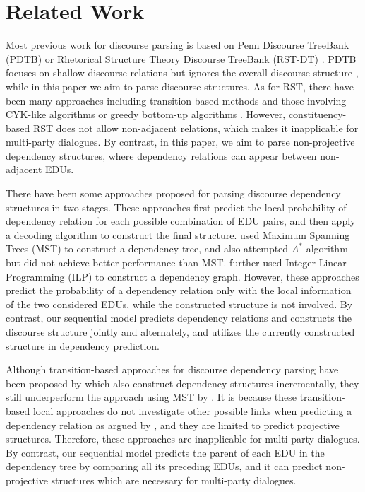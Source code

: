 \documentclass[letterpaper]{article} \usepackage{aaai19}  \usepackage{times}  \usepackage{helvet}  \usepackage{courier}  \usepackage{url}  \usepackage{graphicx}  \usepackage{amssymb}
\begin{document}
\section{Related Work}

Most previous work for discourse parsing is based on Penn Discourse TreeBank (PDTB) \cite{prasad2007penn} or Rhetorical Structure Theory Discourse
TreeBank (RST-DT) \cite{mann1988rhetorical}. 
PDTB focuses on shallow discourse relations but ignores the overall discourse structure \cite{yang2018scidtb}, while in this paper we aim to parse discourse structures.
As for RST, there have been many approaches including transition-based methods  \cite{braud2017cross,wang2017two,yu2018transition} and those involving CYK-like algorithms \cite{joty2015codra,li2016discourse,liu2017learning} or greedy bottom-up algorithms \cite{feng2014linear}. 
However, constituency-based RST does not allow non-adjacent relations, which makes it inapplicable for multi-party dialogues.
By contrast, in this paper, we aim to parse non-projective dependency structures, where dependency relations can appear between non-adjacent EDUs.

There have been some approaches proposed for parsing discourse dependency structures in two stages.
These approaches first predict the local probability of dependency relation for each possible combination of EDU pairs, and then apply a decoding algorithm to construct the final structure. \cite{muller2012constrained,li2014text,afantenos2015discourse} used Maximum Spanning Trees (MST) to construct a dependency tree, and \cite{muller2012constrained} also attempted $A^*$ algorithm but did not achieve better performance than MST.
\cite{perret2016integer} further used Integer Linear Programming (ILP) to construct a dependency graph. 
However, these approaches predict the probability of a dependency relation only with the local information of the two considered EDUs, while the constructed structure is not involved.
By contrast, our sequential model predicts dependency relations and constructs the discourse structure jointly and alternately, and utilizes the currently constructed structure in dependency prediction.

Although transition-based approaches for discourse dependency parsing have been proposed by \cite{jia2018improved,jia2018modeling} which also construct dependency structures incrementally, they still underperform the approach using MST by \cite{li2014text}. It is because these transition-based local approaches do not investigate other possible links when predicting a dependency relation as argued by \cite{jia2018modeling}, and they are limited to predict projective structures.
Therefore, these approaches are inapplicable for multi-party dialogues.
By contrast, our sequential model predicts the parent of each EDU in the dependency tree by comparing all its preceding EDUs, and it can predict non-projective structures which are necessary for multi-party dialogues.
\end{document}
